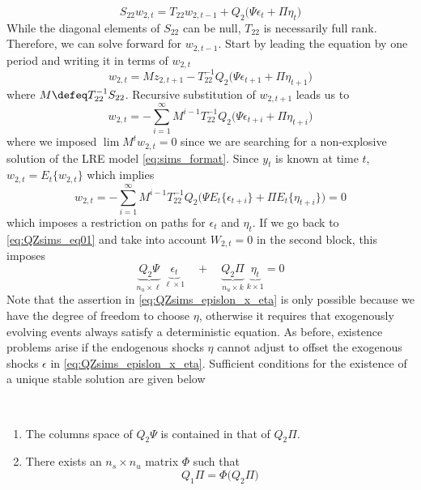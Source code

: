 \documentclass[a4paper,10pt]{article}  %
\begin{document}
\[
   S_{22} w_{2,t} = T_{22} w_{2,t-1} + Q_2\Big( \Psi \epsilon_t + \Pi \eta_t \Big) 
\]
While the diagonal elements of $ S_{22} $ can be null, $ T_{22} $ is necessarily full rank. Therefore, we can solve
forward for $ w_{2,t-1} $. Start by leading the equation by one period and writing it in terms of $ w_{2,t} $
\[
   w_{2,t} = M z_{2,t+1} - T_{22}^{-1} Q_2 \Big( \Psi \epsilon_{t+1} + \Pi \eta_{t+1} \Big) 
\]
where $ M \defeq T_{22}^{-1} S_{22} $. Recursive substitution of $ w_{2,t+1} $ leads us to 
\[
   w_{2,t} = - \sum_{i=1}^{\infty} M^{i-1} T_{22}^{-1} Q_2 \Big( \Psi \epsilon_{t+i} + \Pi \eta_{t+i} \Big)
\]
where we imposed $ \lim M^t w_{2,t} = 0 $ since we are searching for a non-explosive solution of the LRE model
\eqref{eq:sims_format}. Since $ y_{t} $ is known at time $t$, $ w_{2,t} = E_t \{w_{2,t} \}$ which implies
\[
   w_{2,t} = - \sum_{i=1}^{\infty} M^{i-1} T_{22}^{-1} Q_2 
         \Big( 
            \Psi E_t\big\{ \epsilon_{t+i} \big\} + 
            \Pi E_t \big\{\eta_{t+i} \big\}
         \Big) = 0
\]
which imposes a restriction on paths for $ \epsilon_t$ and $\eta_t $. If we go back to \eqref{eq:QZsims_eq01} and take into account $
W_{2,t} = 0$  in the second block, this imposes
\begin{equation}
   \label{eq:QZsims_epislon_x_eta}
   \underbrace{Q_2 \Psi}_{ n_u \times \ell } \ \underbrace{\epsilon_t}_{ \ell \times 1 } 
   \quad + \quad 
   \underbrace{Q_2 \Pi}_{ n_u \times k }     \ \underbrace{\eta_t}_{k\times 1} = 0
\end{equation}
Note that the assertion in \eqref{eq:QZsims_epislon_x_eta} is only possible because we have the degree of freedom to choose $\eta$,
otherwise it requires that exogenously evolving events always satisfy a deterministic equation.
%
As before, existence problems arise if the endogenous shocks $ \eta $ cannot adjust to offset the exogenous shocks
$\epsilon $ in \eqref{eq:QZsims_epislon_x_eta}. Sufficient conditions for the existence of a unique stable solution are given below
\begin{assump} \ \\[-1.5\baselineskip]
   \begin{enumerate}
      \item The columns space of $ Q_2 \Psi $ is contained in that of $ Q_2 \Pi $. 
      \item There exists an $ n_s\times n_u $ matrix $ \Phi $ such that
      \[
         Q_1 \Pi = \Phi \big( Q_2 \Pi \big)
      \]
   \end{enumerate}
\end{assump}
\end{document}
